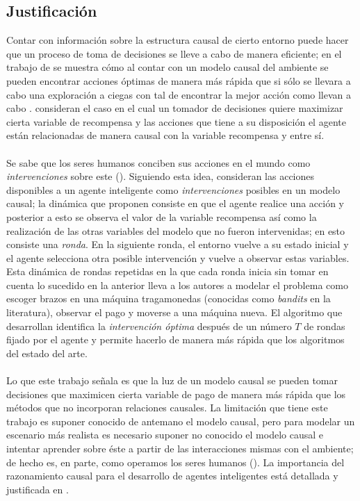 \documentclass[11pt]{article}
\theoremstyle{plain}
\begin{document}
\subsection{Justificación}
Contar con información sobre la estructura causal de cierto entorno puede hacer que un proceso de toma de decisiones se lleve a cabo de manera eficiente; en el trabajo de \cite{lattimoreNIPS2016} se muestra cómo al contar con un modelo causal del ambiente se pueden encontrar acciones óptimas de manera más rápida que si sólo se llevara a cabo una exploración a ciegas con tal de encontrar la mejor acción como llevan a cabo \cite{audibert2010best}. \cite{lattimoreNIPS2016} consideran el caso en el cual un tomador de decisiones quiere maximizar cierta variable de recompensa y las acciones que tiene a su disposición el agente están relacionadas de manera causal con la variable recompensa y entre sí.\\
\\
\indent Se sabe que los seres humanos conciben sus acciones en el mundo como \textit{intervenciones} sobre este (\cite{hagmayer2009decision}). Siguiendo esta idea,  \cite{lattimoreNIPS2016} consideran las acciones disponibles a un agente inteligente como \textit{intervenciones} posibles en un modelo causal; la dinámica que proponen consiste en que el agente realice una acción y posterior a esto se observa el valor de la variable recompensa así como la realización de las otras variables del modelo que no fueron intervenidas; en esto consiste una \textit{ronda}. En la siguiente ronda, el entorno vuelve a su estado inicial y el agente selecciona otra posible intervención y vuelve a observar estas variables. Esta dinámica de rondas repetidas en la que cada ronda inicia sin tomar en cuenta lo sucedido en la anterior lleva a los autores a modelar el problema como escoger brazos en una máquina tragamonedas (conocidas como \textit{bandits} en la literatura), observar el pago y moverse a una máquina nueva. El algoritmo que desarrollan identifica la \textit{intervención óptima} después de un número $T$ de rondas fijado por el agente y permite hacerlo de manera más rápida que los algoritmos del estado del arte.\\
\\
\indent Lo que este trabajo señala es que  la luz de un modelo causal se pueden tomar decisiones que maximicen cierta variable de pago de manera más rápida que los métodos que no incorporan relaciones causales. La limitación que tiene este trabajo es suponer conocido de antemano el modelo causal, pero para modelar un escenario más realista es necesario suponer no conocido el modelo causal e intentar aprender sobre éste a partir de las interacciones mismas con el ambiente; de hecho es, en parte, como operamos los seres humanos (\cite{hagmayer2013repeated}). La importancia del razonamiento causal para el desarrollo de agentes inteligentes está detallada y justificada en \cite{lake2017building}.\\
\end{document}
